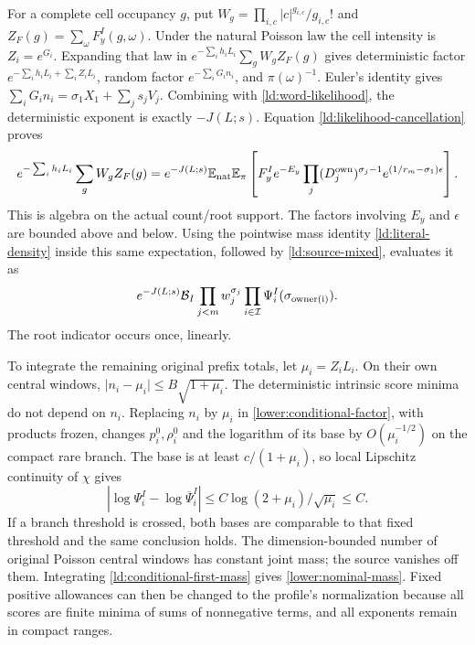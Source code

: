 For a complete cell occupancy \(g\), put
\(W_g=\prod_{i,c}|c|^{g_{i,c}}/g_{i,c}!\) and
\(Z_F(g)=\sum_\omega F_y^I(g,\omega)\).  Under the natural
Poisson law the cell intensity is \(Z_i=e^{G_i}\).  Expanding
that law in
\(e^{-\sum_i h_iL_i}\sum_gW_gZ_F(g)\) gives deterministic factor
\(e^{-\sum_i h_iL_i+\sum_i Z_iL_i}\), random factor
\(e^{-\sum_iG_in_i}\), and \(\pi(\omega)^{-1}\).
Euler's identity gives
\(\sum_iG_in_i=\sigma_1X_1+\sum_js_jV_j\).
Combining with \eqref{ld:word-likelihood}, the deterministic exponent
is exactly \(-J(L;s)\).  Equation
\eqref{ld:likelihood-cancellation} proves
\begin{align}
 e^{-\sum_i h_iL_i}\sum_gW_gZ_F(g)
   =e^{-J(L;s)}\mathbb E_{\rm nat}\mathbb E_\pi
       \left[F_y^I e^{-E_y}
       \prod_j(D_j^{\rm own})^{\sigma_j-1}
       e^{(1/r_m-\sigma_1)\epsilon}\right].
 \label{ld:exact-first-mass}
\end{align}
This is algebra on the actual count/root support.  The factors
involving \(E_y\) and \(\epsilon\) are bounded above and below.
Using the pointwise mass identity \eqref{ld:literal-density}
inside this same expectation, followed by
\eqref{ld:source-mixed}, evaluates it as
\begin{equation}
 e^{-J(L;s)}\mathcal B_I\prod_{j<m}w_j^{\sigma_j}
             \prod_{i\in\mathcal I}\Psi_i^I(\sigma_{\rm owner(i)}).
 \label{ld:conditional-first-mass}
\end{equation}
The root indicator occurs once, linearly.

To integrate the remaining original prefix totals, let
\(\mu_i=Z_iL_i\).  On their own central windows,
\(\lvert n_i-\mu_i\rvert\le B\sqrt{1+\mu_i}\).
The deterministic intrinsic score minima do not depend on \(n_i\).
Replacing \(n_i\) by \(\mu_i\) in
\eqref{lower:conditional-factor}, with products frozen, changes
\(p_i^0,\rho_i^0\) and the logarithm of its base by
\(O(\mu_i^{-1/2})\) on the compact rare branch.  The base is
at least \(c/(1+\mu_i)\), so local Lipschitz continuity of
\(\chi\) gives
\begin{equation}
 |\log\Psi_i^I-\log\overline\Psi_i^I|
              \le C\log(2+\mu_i)/\sqrt{\mu_i}\le C.
 \label{ld:count-comparison}
\end{equation}
If a branch threshold is crossed, both bases are comparable to that
fixed threshold and the same conclusion holds.  The dimension-bounded
number of original Poisson central windows has constant joint mass;
the source vanishes off them.  Integrating
\eqref{ld:conditional-first-mass} gives \eqref{lower:nominal-mass}.
Fixed positive allowances can then be changed to the profile's normalization because all scores
are finite minima of sums of nonnegative terms, and all exponents
remain in compact ranges.


